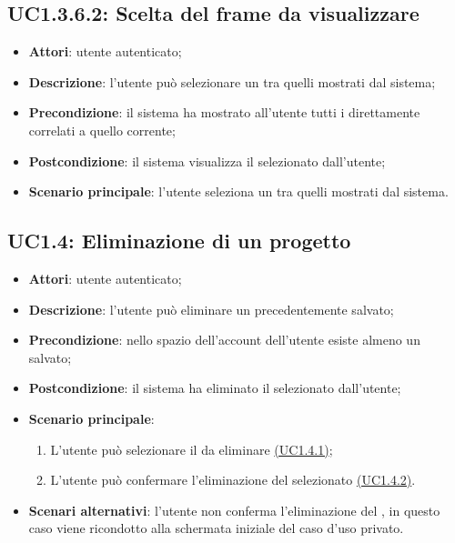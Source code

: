 \subsection{UC1.3.6.2: Scelta del frame da visualizzare}
\label{UC1.3.6.2}
\begin{itemize}
\item \textbf{Attori}: utente autenticato;
\item \textbf{Descrizione}: l'utente può selezionare un  tra quelli mostrati dal sistema;
\item \textbf{Precondizione}: il sistema ha mostrato all'utente tutti i  direttamente correlati a quello corrente;
\item \textbf{Postcondizione}: il sistema visualizza il  selezionato dall'utente;
\item \textbf{Scenario principale}:
l'utente seleziona un  tra quelli mostrati dal sistema.
\end{itemize}
\subsection{UC1.4: Eliminazione di un progetto}
\label{UC1.4}
\begin{itemize}
\item \textbf{Attori}: utente autenticato;
\item \textbf{Descrizione}: l’utente può eliminare un  precedentemente salvato;
\item \textbf{Precondizione}: nello spazio dell’account dell’utente esiste almeno un  salvato;
\item \textbf{Postcondizione}: il sistema ha eliminato il  selezionato dall'utente;
\item \textbf{Scenario principale}:
\begin{enumerate}
\item L’utente può selezionare il  da eliminare \hyperref[UC1.4.1]{(UC1.4.1)};
\item L’utente può confermare l’eliminazione del  selezionato \hyperref[UC1.4.2]{(UC1.4.2)}.
\end{enumerate}
\item \textbf{Scenari alternativi}:
l’utente non conferma l’eliminazione del , in questo caso viene ricondotto alla schermata iniziale del caso d’uso privato.
\end{itemize}
